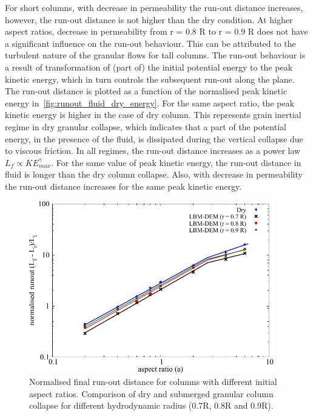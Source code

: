 For short columns, with decrease in permeability the run-out distance 
increases, however, the run-out distance is not higher than the dry condition. 
At higher aspect ratios, decrease in permeability from r = 0.8 R to r = 0.9 R 
does not have a significant influence on the run-out behaviour. This can be 
attributed to the turbulent nature of the granular flows for tall 
columns. The run-out behaviour is a result of transformation of (part of) the 
initial potential energy to the peak kinetic energy, which in turn controls the 
subsequent run-out along the plane. The run-out distance is plotted as a 
function of the normalised peak kinetic energy 
in~\cref{fig:runout_fluid_dry_energy}. For the same aspect ratio, the peak 
kinetic energy is higher in the case of dry column. This represents grain 
inertial regime in dry granular collapse, which indicates that a part of the 
potential energy, in the presence of the fluid, is dissipated during the 
vertical collapse due to viscous friction. In all regimes, the 
run-out distance increases as a power law $L_f \propto KE_{max}^\gamma$. For 
the same value of peak kinetic energy, the run-out distance in fluid is longer 
than the dry column collapse. Also, with decrease in 
permeability the run-out distance increases for the same peak kinetic energy. 
\begin{figure}[tbhp]
	\centering
	\includegraphics[width=0.95\textwidth]{runout_fluid_dry}
	\caption{Normalised final run-out distance for columns with different 
	initial aspect ratios. Comparison of dry and submerged granular column 
	collapse for different hydrodynamic radius (0.7R, 0.8R and 0.9R).}
	\label{fig:runout_fluid_dry}
\end{figure} 

